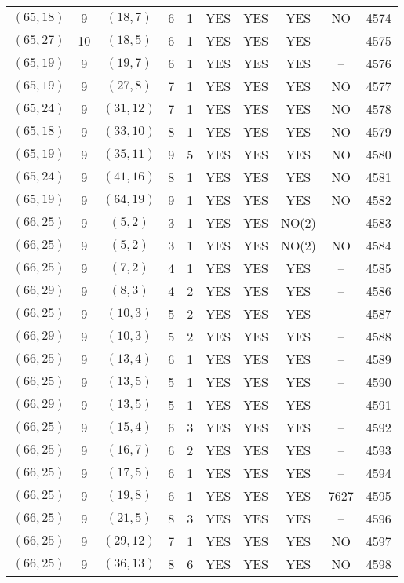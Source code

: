 \begin{longtable}{|c|c|c|c|c|c|c|c|c|c|}
$(65, 18)$ & 9 & $(18, 7)$ & 6 & 1 & YES & YES & YES & NO & 4574\\
$(65, 27)$ & 10 & $(18, 5)$ & 6 & 1 & YES & YES & YES & -- & 4575\\
$(65, 19)$ & 9 & $(19, 7)$ & 6 & 1 & YES & YES & YES & -- & 4576\\
$(65, 19)$ & 9 & $(27, 8)$ & 7 & 1 & YES & YES & YES & NO & 4577\\
$(65, 24)$ & 9 & $(31, 12)$ & 7 & 1 & YES & YES & YES & NO & 4578\\
$(65, 18)$ & 9 & $(33, 10)$ & 8 & 1 & YES & YES & YES & NO & 4579\\
$(65, 19)$ & 9 & $(35, 11)$ & 9 & 5 & YES & YES & YES & NO & 4580\\
$(65, 24)$ & 9 & $(41, 16)$ & 8 & 1 & YES & YES & YES & NO & 4581\\
$(65, 19)$ & 9 & $(64, 19)$ & 9 & 1 & YES & YES & YES & NO & 4582\\
$(66, 25)$ & 9 & $(5, 2)$ & 3 & 1 & YES & YES & NO(2) & -- & 4583\\
$(66, 25)$ & 9 & $(5, 2)$ & 3 & 1 & YES & YES & NO(2) & NO & 4584\\
$(66, 25)$ & 9 & $(7, 2)$ & 4 & 1 & YES & YES & YES & -- & 4585\\
$(66, 29)$ & 9 & $(8, 3)$ & 4 & 2 & YES & YES & YES & -- & 4586\\
$(66, 25)$ & 9 & $(10, 3)$ & 5 & 2 & YES & YES & YES & -- & 4587\\
$(66, 29)$ & 9 & $(10, 3)$ & 5 & 2 & YES & YES & YES & -- & 4588\\
$(66, 25)$ & 9 & $(13, 4)$ & 6 & 1 & YES & YES & YES & -- & 4589\\
$(66, 25)$ & 9 & $(13, 5)$ & 5 & 1 & YES & YES & YES & -- & 4590\\
$(66, 29)$ & 9 & $(13, 5)$ & 5 & 1 & YES & YES & YES & -- & 4591\\
$(66, 25)$ & 9 & $(15, 4)$ & 6 & 3 & YES & YES & YES & -- & 4592\\
$(66, 25)$ & 9 & $(16, 7)$ & 6 & 2 & YES & YES & YES & -- & 4593\\
$(66, 25)$ & 9 & $(17, 5)$ & 6 & 1 & YES & YES & YES & -- & 4594\\
$(66, 25)$ & 9 & $(19, 8)$ & 6 & 1 & YES & YES & YES & 7627 & 4595\\
$(66, 25)$ & 9 & $(21, 5)$ & 8 & 3 & YES & YES & YES & -- & 4596\\
$(66, 25)$ & 9 & $(29, 12)$ & 7 & 1 & YES & YES & YES & NO & 4597\\
$(66, 25)$ & 9 & $(36, 13)$ & 8 & 6 & YES & YES & YES & NO & 4598\\

\end{longtable}
